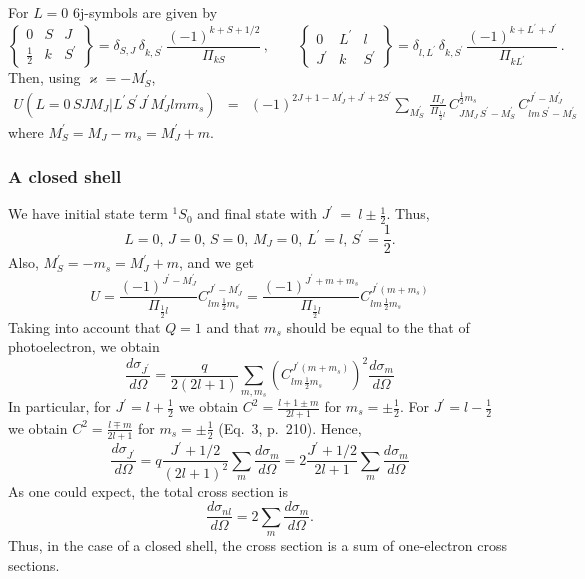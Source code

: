 \documentclass[a4paper,oneside,12pt]{extarticle}
\begin{document}
For $L=0$ 6j-symbols are given by
$$
\left \{
\begin{array}{ccc}
0 & S & J \\
\frac{1}{2} & k & S^{\prime}
\end{array}
\right \} = \delta_{S,J} \, \delta_{k,S^{\prime}} \,
\frac{(-1)^{k+S+1/2}}{\Pi_{kS}}
\,, \qquad
\left \{
\begin{array}{ccc}
0 & L^{\prime} & l \\
J^{\prime} & k & S^{\prime}
\end{array}
\right \} =  \delta_{l,L^{\prime}} \, \delta_{k,S^{\prime}} \,
\frac{(-1)^{k+L^{\prime}+J^{\prime}}}{\Pi_{kL^{\prime}}} \,.
$$
%
Then, using $\varkappa=-M_S^{\prime}$,
%
\begin{equation}
\begin{array}{lll}
U(L=0 \, S J M_J | L^{\prime} S^{\prime} J^{\prime} M_J^{\prime} l m m_s)
&=& \displaystyle
(-1)^{2J+1-M_J^{\prime}+J^{\prime}+2S^{\prime}} \sum_{M_S^\prime}\, 
\frac{\Pi_{J}}{\Pi_{\frac{1}{2}l}} \,
C^{\frac{1}{2} m_s}_{J M_J \,
S^{\prime} -M_S^{\prime}} \,
C^{J^{\prime} -M_J^{\prime}}_{lm \, S^{\prime} -M_S^{\prime}}
%
\end{array}
\end{equation}
where $M_S^{\prime}=M_J-m_s=M_J^{\prime}+m$.

\subsubsection {A closed shell}

We have initial state term $^1S_0$ and final state with $J^{\prime}~=~l\pm\frac{1}{2}$. Thus,
$$
L=0,\, J=0,\, S=0,\, M_J=0,\, L^{\prime}=l,\, S^{\prime}=\frac{1}{2}.
$$
Also, $M_S^{\prime}=-m_s=M_J^{\prime}+m$, and we get
\begin{equation}
U = \frac{(-1)^{J^\prime -M_J^\prime}}{\Pi_{\frac{1}{2} l}} C^{J^\prime -M_J^\prime}_{lm\,\frac{1}{2} m_s} = 
\frac{(-1)^{J^\prime + m+m_s}}{\Pi_{\frac{1}{2} l}} C^{J^\prime (m+m_s)}_{lm\,\frac{1}{2} m_s}
\label{eq:Uclosed}
\end{equation}
Taking into account that $Q=1$ and that $m_s$ should be equal to the that of photoelectron, we obtain
$$
\frac{d \sigma_{J^{\prime}}}{d \Omega} = \frac{q}{2(2l+1)}\sum_{m, m_s}
\left(C^{J^\prime (m+m_s)}_{lm\,\frac{1}{2} m_s} \right)^2 \frac{d \sigma_{m}}{d \Omega}
$$
In particular, for $J^\prime=l+\frac{1}{2}$ we obtain $C^2=\frac{l+1 \pm m}{2l+1}$ for $m_s=\pm\frac{1}{2}$.
For $J^\prime=l-\frac{1}{2}$ we obtain $C^2=\frac{l \mp m}{2l+1}$ for $m_s=\pm\frac{1}{2}$ (Eq.~3, p.~210). Hence,
$$
\frac{d \sigma_{J^{\prime}}}{d \Omega} = q \frac{J^\prime + 1/2}{(2l+1)^2}\sum_{m}
\frac{d \sigma_{m}}{d \Omega} = 2\frac{J^\prime + 1/2}{2l+1}\sum_{m}
\frac{d \sigma_{m}}{d \Omega}
$$
As one could expect, the total cross section is
$$
\frac{d \sigma_{nl}}{d \Omega} = 2\sum_{m} \frac{d \sigma_{m}}{d \Omega}.
$$
Thus, in the case of a closed shell, the cross section is a sum of one-electron cross sections.
\end{document}
